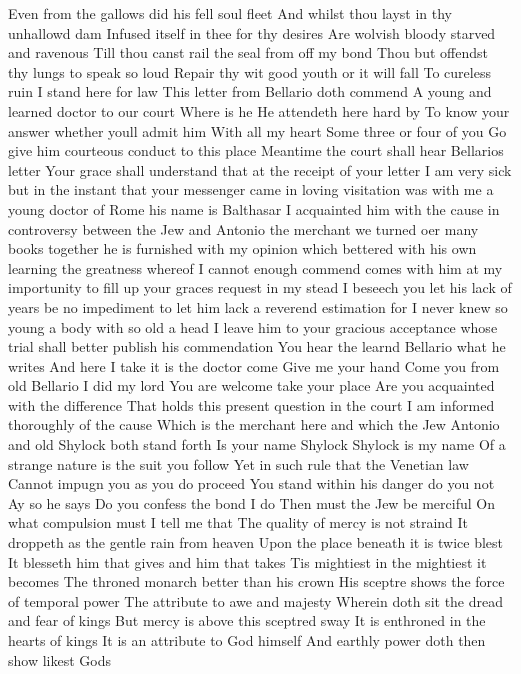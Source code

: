 Even from the gallows did his fell soul fleet
And whilst thou layst in thy unhallowd dam
Infused itself in thee for thy desires
Are wolvish bloody starved and ravenous
Till thou canst rail the seal from off my bond
Thou but offendst thy lungs to speak so loud
Repair thy wit good youth or it will fall
To cureless ruin I stand here for law
This letter from Bellario doth commend
A young and learned doctor to our court
Where is he
He attendeth here hard by
To know your answer whether youll admit him
With all my heart Some three or four of you
Go give him courteous conduct to this place
Meantime the court shall hear Bellarios letter
Your grace shall understand that at the receipt of
your letter I am very sick but in the instant that
your messenger came in loving visitation was with
me a young doctor of Rome his name is Balthasar I
acquainted him with the cause in controversy between
the Jew and Antonio the merchant we turned oer
many books together he is furnished with my
opinion which bettered with his own learning the
greatness whereof I cannot enough commend comes
with him at my importunity to fill up your graces
request in my stead I beseech you let his lack of
years be no impediment to let him lack a reverend
estimation for I never knew so young a body with so
old a head I leave him to your gracious
acceptance whose trial shall better publish his
commendation
You hear the learnd Bellario what he writes
And here I take it is the doctor come
Give me your hand Come you from old Bellario
I did my lord
You are welcome take your place
Are you acquainted with the difference
That holds this present question in the court
I am informed thoroughly of the cause
Which is the merchant here and which the Jew
Antonio and old Shylock both stand forth
Is your name Shylock
Shylock is my name
Of a strange nature is the suit you follow
Yet in such rule that the Venetian law
Cannot impugn you as you do proceed
You stand within his danger do you not
Ay so he says
Do you confess the bond
I do
Then must the Jew be merciful
On what compulsion must I tell me that
The quality of mercy is not straind
It droppeth as the gentle rain from heaven
Upon the place beneath it is twice blest
It blesseth him that gives and him that takes
Tis mightiest in the mightiest it becomes
The throned monarch better than his crown
His sceptre shows the force of temporal power
The attribute to awe and majesty
Wherein doth sit the dread and fear of kings
But mercy is above this sceptred sway
It is enthroned in the hearts of kings
It is an attribute to God himself
And earthly power doth then show likest Gods
